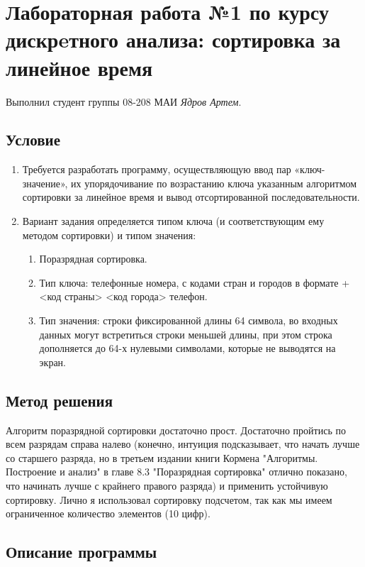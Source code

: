 \documentclass[12pt]{article}
\begin{document}
	
	\section*{Лабораторная работа №1 по курсу дискрeтного анализа: сортировка за линейное время}
	
	Выполнил студент группы 08-208 МАИ \textit{Ядров Артем}.
	
	\subsection*{Условие}
	\begin{enumerate}
		\item Требуется разработать программу, осуществляющую ввод пар «ключ-значение», их упорядочивание по возрастанию ключа указанным алгоритмом сортировки за линейное время и вывод отсортированной последовательности.
		\item Вариант задания определяется типом ключа (и соответствующим ему методом сортировки) и типом значения:
		\begin{enumerate}
			\item Поразрядная сортировка.
			\item Тип ключа: телефонные номера, с кодами стран и городов в формате +<код страны> <код города> телефон.
			\item Тип значения: строки фиксированной длины 64 символа, во входных данных могут встретиться строки меньшей длины, при этом строка дополняется до 64-х нулевыми символами, которые не выводятся на экран.
		\end{enumerate}
	\end{enumerate}
	
	\subsection*{Метод решения}
	
	Алгоритм поразрядной сортировки достаточно прост. Достаточно пройтись по всем разрядам справа налево (конечно, интуиция подсказывает, что начать лучше со старшего разряда, но в третьем издании книги Кормена "Алгоритмы. Построение и анализ" в главе 8.3 "Поразрядная сортировка" отлично показано, что начинать лучше с крайнего правого разряда) и применить устойчивую сортировку. Лично я использовал сортировку подсчетом, так как мы имеем ограниченное количество элементов (10 цифр).
	
	\subsection*{Описание программы}
	
\end{document}
